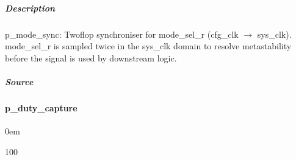 \documentclass[letterpaper,10pt,english]{sphinxmanual}
\begin{document}
\subparagraph{Description}
\label{\detokenize{modules/cfg_sync/processes/p_mode_sync:description}}
\sphinxAtStartPar
p\_mode\_sync: Two\sphinxhyphen{}flop synchroniser for mode\_sel\_r (cfg\_clk \(\rightarrow\) sys\_clk).
mode\_sel\_r is sampled twice in the sys\_clk domain to resolve
metastability before the signal is used by downstream logic.

\noindent{}


\subparagraph{Source}
\label{\detokenize{modules/cfg_sync/processes/p_mode_sync:source}}
\begin{sphinxVerbatim}[commandchars=\\\{\}]
\end{sphinxVerbatim}

\sphinxstepscope


\paragraph{p\_duty\_capture}
\label{\detokenize{modules/cfg_sync/processes/p_duty_capture:p-duty-capture}}\label{\detokenize{modules/cfg_sync/processes/p_duty_capture::doc}}
\begin{DUlineblock}{0em}
\item[]  
\item[]  100
\item[]  
\item[]  
\end{DUlineblock}
\end{document}
